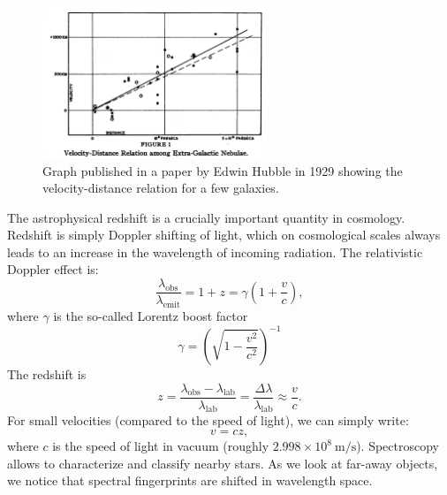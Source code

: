 \documentclass[a4paper,12pt]{article}
\theoremstyle{remark}
\newcommand{\mrm}[1]{\mathrm{#1}}
\renewcommand{\=}[1]{\stackrel{#1}{=}} %
\theoremstyle{plain}
\theoremstyle{definition}
\begin{document}
\begin{figure}[t]
\begin{center}
    \includegraphics*[angle=0,width=0.6\textwidth]{img/hubble_relation.png}
    \caption[Insert text]{Graph published in a paper by Edwin Hubble in 1929 showing the velocity-distance relation for a few galaxies.}
\label{fig:hubble}
\end{center}
\end{figure}

The astrophysical redshift is a crucially important quantity in cosmology. Redshift is simply Doppler shifting of light, which on cosmological scales always leads to an increase in the wavelength of incoming radiation. The relativistic Doppler effect is:
\begin{equation}
\frac{\lambda _\mrm{obs}}{\lambda _\mrm{emit}} = 1 + z = \gamma \left(1 + \frac{v}{c} \right),
\end{equation}
where $\gamma$ is the so-called Lorentz boost factor
\begin{equation}
\gamma = \left( \sqrt{1 - \frac{v^2}{c^2}} \right)^{-1}
\end{equation}
The redshift is
\begin{equation}
z = \frac{\lambda _\mrm{obs} - \lambda _\mrm{lab}}{\lambda _\mrm{lab}} = \frac{\Delta \lambda}{\lambda _\mrm{lab}} \approx \frac{v}{c}.
\end{equation} 
For small velocities (compared to the speed of light), we can simply write:
\begin{equation}
v = c z,
\end{equation}
where $c$ is the speed of light in vacuum (roughly $2.998 \times 10^{8} \:\mrm{m/s}$). Spectroscopy allows to characterize and classify nearby stars. As we look at far-away objects, we notice that spectral fingerprints are shifted in wavelength space. 

\end{document}
